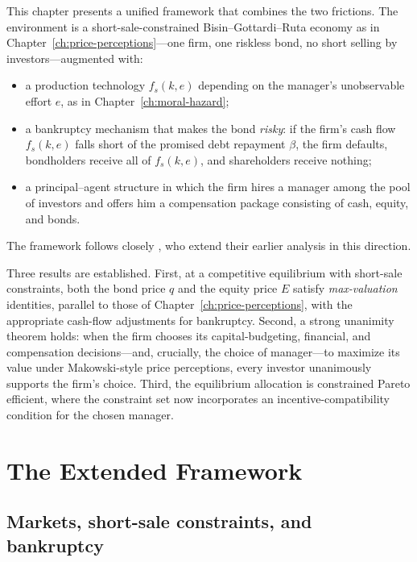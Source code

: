 \documentclass[11pt,a4paper,oneside]{book}
\theoremstyle{plain}
\theoremstyle{definition}
\theoremstyle{remark}
\numberwithin{equation}{chapter}
\begin{document}
This chapter presents a unified framework that combines the two frictions.
The environment is a short-sale-constrained Bisin--Gottardi--Ruta economy as in Chapter~\ref{ch:price-perceptions}---one firm, one riskless bond, no short selling by investors---augmented with:
\begin{itemize}
  \item a production technology $f_s(k, e)$ depending on the manager's unobservable effort $e$, as in Chapter~\ref{ch:moral-hazard};
  \item a bankruptcy mechanism that makes the bond \emph{risky}: if the firm's cash flow $f_s(k, e)$ falls short of the promised debt repayment $\beta$, the firm defaults, bondholders receive all of $f_s(k, e)$, and shareholders receive nothing;
  \item a principal--agent structure in which the firm hires a manager among the pool of investors and offers him a compensation package consisting of cash, equity, and bonds.
\end{itemize}
The framework follows closely \citet{BisinGottardiRuta2015}, who extend their earlier analysis in this direction.

Three results are established.
First, at a competitive equilibrium with short-sale constraints, both the bond price $q$ and the equity price $E$ satisfy \emph{max-valuation} identities, parallel to those of Chapter~\ref{ch:price-perceptions}, with the appropriate cash-flow adjustments for bankruptcy.
Second, a strong unanimity theorem holds: when the firm chooses its capital-budgeting, financial, and compensation decisions---and, crucially, the choice of manager---to maximize its value under Makowski-style price perceptions, every investor unanimously supports the firm's choice.
Third, the equilibrium allocation is constrained Pareto efficient, where the constraint set now incorporates an incentive-compatibility condition for the chosen manager.

\section{The Extended Framework}
\label{sec:MH-CPP-framework}

\subsection{Markets, short-sale constraints, and bankruptcy}
\end{document}
